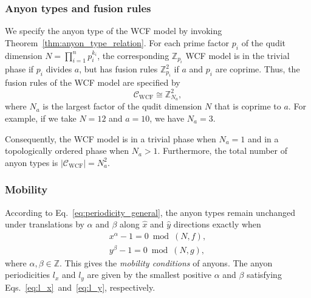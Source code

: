 \documentclass[aps,prb,english,superscriptaddress,twocolumn,tightenlines,showpacs,longbibliography,floatfix,amsfonts]{revtex4-2}
\begin{document}
\subsubsection{Anyon types and fusion rules}

We specify the anyon type of the WCF model by invoking Theorem~\ref{thm:anyon_type_relation}. For each prime factor $p_i$ of the qudit dimension $N=\prod_{i=1}^np_i^{k_i}$, the corresponding $\mathbb{Z}_{p_i}$ WCF model is in the trivial phase if $p_i$ divides $a$, but has fusion rules $\mathbb{Z}_{p_{i}}^2$ if $a$ and $p_i$ are coprime. Thus, the fusion rules of the WCF model are specified by
\begin{equation}
    \mathcal{C}_{\operatorname{WCF}}\cong\mathbb{Z}_{N_a}^2\label{eq:fstc},
\end{equation}
where $N_a$ is the largest factor of the qudit dimension $N$ that is coprime to $a$. For example, if we take $N=12$ and $a=10$, we have $N_a=3$.

Consequently, the WCF model is in a trivial phase when $N_a=1$ and in a topologically ordered phase when $N_a>1$. Furthermore, the total number of anyon types is $|\mathcal{C}_{\operatorname{WCF}}|=N_a^2$.
  
\subsubsection{Mobility}

According to Eq.~\eqref{eq:periodicity_general}, the anyon types remain unchanged under translations by $\alpha$ and $\beta$ along $\hat{x}$ and $\hat{y}$ directions exactly when
\begin{subequations}
\begin{align}
        x^{\alpha}-1=0\bmod (N,f),\label{eq:l_x}\\
        y^{\beta}-1=0\bmod(N,g), \label{eq:l_y}
\end{align}    
\end{subequations}
where $\alpha,\beta\in\mathbb{Z}$. This gives the \emph{mobility conditions} of anyons. The anyon periodicities $l_x$ and $l_y$ are given by the smallest positive $\alpha$ and $\beta$ satisfying Eqs.~\eqref{eq:l_x}~and~\eqref{eq:l_y}, respectively.
  
\end{document}
